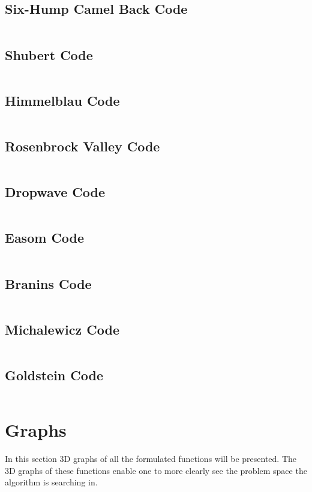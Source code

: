 \subsection{Six-Hump Camel Back Code}
\inputminted[fontsize=\tiny]{python}{./Graphs/Camel.py}
\subsection{Shubert Code}
\inputminted[fontsize=\tiny]{python}{./Graphs/Shubert.py}
\subsection{Himmelblau Code}
\inputminted[fontsize=\tiny]{python}{./Graphs/Himmelblau.py}
\subsection{Rosenbrock Valley Code}
\inputminted[fontsize=\tiny]{python}{./Graphs/Rosenbrock.py}
\subsection{Dropwave Code}
\inputminted[fontsize=\tiny]{python}{./Graphs/Dropwave.py}
\subsection{Easom Code}
\inputminted[fontsize=\tiny]{python}{./Graphs/Easom.py}
\subsection{Branins Code}
\inputminted[fontsize=\tiny]{python}{./Graphs/Branin.py}
\subsection{Michalewicz Code}
\inputminted[fontsize=\tiny]{python}{./Graphs/Michalewicz.py}
\subsection{Goldstein Code}
\inputminted[fontsize=\tiny]{python}{./Graphs/Goldstein.py}
\section{Graphs}
In this section 3D graphs of all the formulated functions will be presented. The 3D graphs of these functions enable one to more clearly see the problem space the algorithm is searching in.

